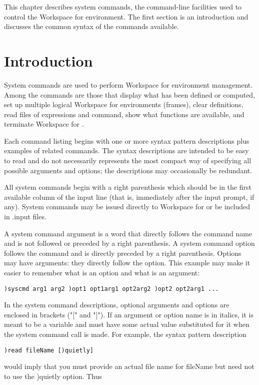 This chapter describes system commands, the command-line facilities used to control the Workspace for \nr{} environment. The first section is an introduction and discusses the common syntax of the commands available.

\section{Introduction}

System commands are used to perform Workspace for \nr{} environment management. Among the commands are those that display what has been defined or computed, set up multiple logical Workspace for \nr{} environments (frames), clear definitions, read files of expressions and command, show what functions are available, and terminate Workspace for \nr{}.

Each command listing begins with one or more syntax pattern descriptions plus examples of related commands. The syntax descriptions are intended to be easy to read and do not necessarily represents the most compact way of specifying all possible arguments and options; the descriptions may occasionally be redundant.

All system commands begin with a right parenthesis which should be in the first available column of the input line (that is, immediately after the input prompt, if any). System commands may be issued directly to Workspace for \nr{} or be included in .input files.

A system command argument is a word that directly follows the command name and is not followed or preceded by a right parenthesis. A system command option follows the command and is directly preceded by a right parenthesis. Options may have arguments: they directly follow the option. This example may make it easier to remember what is an option and what is an argument:
\begin{verbatim}
)syscmd arg1 arg2 )opt1 opt1arg1 opt2arg2 )opt2 opt2arg1 ...
\end{verbatim}
In the system command descriptions, optional arguments and options are enclosed in brackets ("[" and "]"). If an argument or option name is in italics, it is meant to be a variable and must have some actual value substituted for it when the system command call is made. For example, the syntax pattern description
\begin{verbatim}
)read fileName [)quietly]
\end{verbatim}
would imply that you must provide an actual file name for fileName but need not to use the )quietly option. Thus

